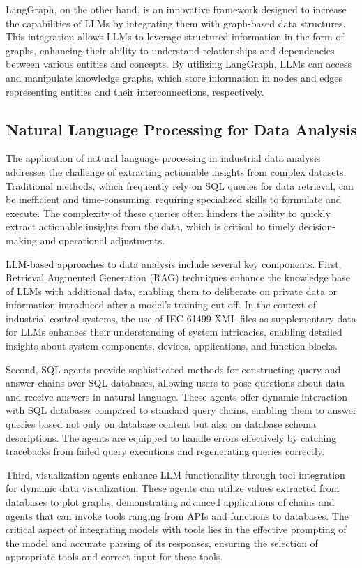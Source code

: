 LangGraph, on the other hand, is an innovative framework designed to increase the capabilities of LLMs by integrating them with graph-based data structures. This integration allows LLMs to leverage structured information in the form of graphs, enhancing their ability to understand relationships and dependencies between various entities and concepts. By utilizing LangGraph, LLMs can access and manipulate knowledge graphs, which store information in nodes and edges representing entities and their interconnections, respectively.

\subsection{Natural Language Processing for Data Analysis}

The application of natural language processing in industrial data analysis addresses the challenge of extracting actionable insights from complex datasets. Traditional methods, which frequently rely on SQL queries for data retrieval, can be inefficient and time-consuming, requiring specialized skills to formulate and execute. The complexity of these queries often hinders the ability to quickly extract actionable insights from the data, which is critical to timely decision-making and operational adjustments.

LLM-based approaches to data analysis include several key components. First, Retrieval Augmented Generation (RAG) techniques enhance the knowledge base of LLMs with additional data, enabling them to deliberate on private data or information introduced after a model's training cut-off. In the context of industrial control systems, the use of IEC 61499 XML files as supplementary data for LLMs enhances their understanding of system intricacies, enabling detailed insights about system components, devices, applications, and function blocks.

Second, SQL agents provide sophisticated methods for constructing query and answer chains over SQL databases, allowing users to pose questions about data and receive answers in natural language. These agents offer dynamic interaction with SQL databases compared to standard query chains, enabling them to answer queries based not only on database content but also on database schema descriptions. The agents are equipped to handle errors effectively by catching tracebacks from failed query executions and regenerating queries correctly.

Third, visualization agents enhance LLM functionality through tool integration for dynamic data visualization. These agents can utilize values extracted from databases to plot graphs, demonstrating advanced applications of chains and agents that can invoke tools ranging from APIs and functions to databases. The critical aspect of integrating models with tools lies in the effective prompting of the model and accurate parsing of its responses, ensuring the selection of appropriate tools and correct input for these tools.

